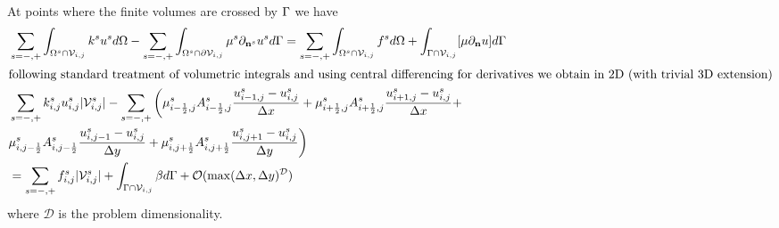 \documentclass{elsarticle}
\begin{document}
At points where the finite volumes are crossed by $\rm \Gamma$ we have
\begin{align*}
	 & \sum_{s=-,+}\int_{\Omega^s \cap \mathcal{V}_{i,j}}  k^{s} u^{s} d\Omega -\sum_{s=-,+} \int_{\Omega^s\cap \partial\mathcal{V}_{i,j}} \mu^{s}\partial_{\mathbf{n}^s} u^s  d\Gamma = \sum_{s=-,+}\int_{\Omega^s \cap \mathcal{V}_{i,j}}  f^{s} d\Omega + \int_{\Gamma \cap \mathcal{V}_{i,j}}[\mu\partial_{\mathbf{n}}u]d\Gamma \\
	\intertext{following standard treatment of volumetric integrals and using central differencing for derivatives we obtain in 2D (with trivial 3D extension)}
	 & \sum_{s=-,+} k_{i,j}^s u_{i,j}^{s} |\mathcal{V}_{i,j}^s| - \sum_{s=-,+}\bigg( \mu_{i-\frac{1}{2},j}^s A_{i-\frac{1}{2},j}^s\frac{u_{i-1,j}^s - u_{i,j}^s}{\Delta x}     +   \mu_{i+\frac{1}{2},j}^s A_{i+\frac{1}{2},j}^s\frac{u_{i+1,j}^s - u_{i,j}^s}{\Delta x} +                                                          \\
	 & \mu_{i, j-\frac{1}{2}}^s A_{i, j-\frac{1}{2}}^s\frac{u_{i,j-1}^s - u_{i,j}^s}{\Delta y} + \mu_{i, j+\frac{1}{2}}^s A_{i, j+\frac{1}{2}}^s\frac{u_{i,j+1}^s - u_{i,j}^s}{\Delta y} \bigg)                                                                                                                                     \\
	 & =  \sum_{s=-,+} f_{i,j}^{s} |\mathcal{V}_{i,j}^s| + \int_{\Gamma\cap \mathcal{V}_{i,j}} \beta d\Gamma + \mathcal{O}(\max(\Delta x, \Delta y)^\mathcal{D})
\end{align*}
where $\mathcal{D}$ is the problem dimensionality.
\end{document}
